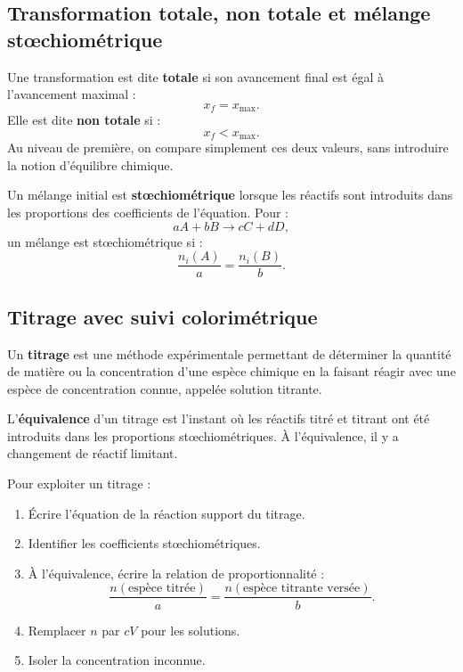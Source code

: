 \documentclass[11pt,a4paper]{article}
\newcommand{\xmax}{x_{\max}}
\newcommand{\xf}{x_f}
\begin{document}
\subsection{Transformation totale, non totale et mélange stœchiométrique}

\begin{definitionbox}
Une transformation est dite \textbf{totale} si son avancement final est égal à l'avancement maximal :
\[
\xf=\xmax.
\]
Elle est dite \textbf{non totale} si :
\[
\xf<\xmax.
\]
Au niveau de première, on compare simplement ces deux valeurs, sans introduire la notion d'équilibre chimique.
\end{definitionbox}

\begin{definitionbox}
Un mélange initial est \textbf{stœchiométrique} lorsque les réactifs sont introduits dans les proportions des coefficients de l'équation. Pour :
\[
aA+bB\rightarrow cC+dD,
\]
un mélange est stœchiométrique si :
\[
\frac{n_i(A)}{a}=\frac{n_i(B)}{b}.
\]
\end{definitionbox}

\subsection{Titrage avec suivi colorimétrique}

\begin{definitionbox}
Un \textbf{titrage} est une méthode expérimentale permettant de déterminer la quantité de matière ou la concentration d'une espèce chimique en la faisant réagir avec une espèce de concentration connue, appelée solution titrante.
\end{definitionbox}

\begin{definitionbox}
L'\textbf{équivalence} d'un titrage est l'instant où les réactifs titré et titrant ont été introduits dans les proportions stœchiométriques. À l'équivalence, il y a changement de réactif limitant.
\end{definitionbox}

\begin{methodbox}
Pour exploiter un titrage :
\begin{enumerate}
\item Écrire l'équation de la réaction support du titrage.
\item Identifier les coefficients stœchiométriques.
\item À l'équivalence, écrire la relation de proportionnalité :
\[
\frac{n(\text{espèce titrée})}{a}=\frac{n(\text{espèce titrante versée})}{b}.
\]
\item Remplacer $n$ par $cV$ pour les solutions.
\item Isoler la concentration inconnue.
\end{enumerate}
\end{methodbox}
\end{document}
